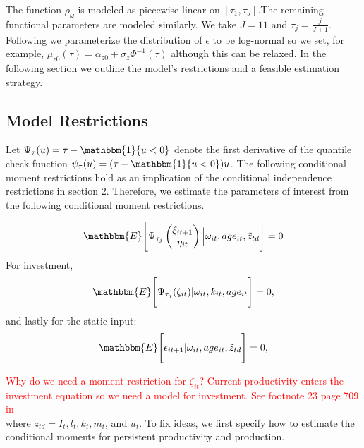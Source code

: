 \documentclass{article}
\begin{document}
The function $\rho_{\omega}$ is modeled as piecewise linear on $[\tau_{1}, \tau_{J}]$.The remaining functional parameters are modeled similarly. We take $J=11$ and $\tau_{j}=\frac{j}{J+1}$. Following \cite{Arellano2017} we parameterize the distribution of $\epsilon$ to be log-normal so we set, for example, $\mu_{z0}(\tau)=\alpha_{z0}+\sigma_{z}\Phi^{-1}(\tau)$ although this can be relaxed. In the following section we outline the model's restrictions and a feasible estimation strategy.

\subsection{Model Restrictions}
Let $\Psi_{\tau}(u)=\tau-\mathbbm{1}\{u<0\}$ denote the first derivative of the quantile check function $\psi_{\tau}(u)=(\tau-\mathbbm{1}\{u<0\})u$. The following conditional moment restrictions hold as an implication of the conditional independence restrictions in section 2. Therefore, we estimate the parameters of interest from the following conditional moment restrictions.

\begin{equation}\label{qmoments}
\mathbbm{E}\Bigg[\Psi_{\tau_{j}}
\begin{pmatrix}
\xi_{it+1} \\
\eta_{it}
\end{pmatrix}
\Big|\omega_{it}, age_{it}, \tilde{z}_{td}\Bigg]=0
\end{equation}
For investment,
\begin{equation}\label{imoment}
\mathbbm{E}\Bigg[\Psi_{\tau_{j}}(\zeta_{it})|\omega_{it}, k_{it}, age_{it}\Bigg]=0,
\end{equation}
and lastly for the static input:
\begin{equation}\label{staticmoment}
\mathbbm{E}\Bigg[\epsilon_{it+1}|\omega_{it},age_{it}, \tilde{z}_{td}\Bigg]=0,
\end{equation}


\textcolor{red}{Why do we need a moment restriction for $\zeta_{it}$? Current productivity enters the investment equation so we need a model for investment. See footnote 23 page 709 in \cite{Arellano2017}}\\

where $\tilde{z}_{td}=I_{t}, l_{t}, k_{t}, m_{t}$, and $u_{t}$. To fix ideas, we first specify how to estimate the conditional moments for persistent productivity and production.\\
\end{document}
